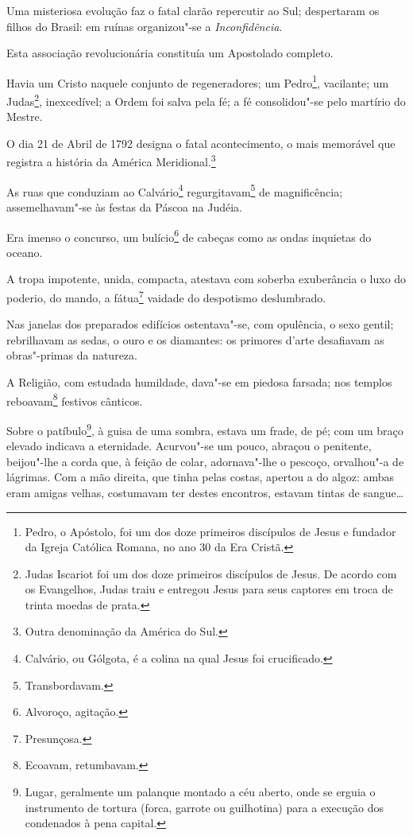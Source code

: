 Uma misteriosa evolução faz o fatal clarão repercutir ao Sul;
despertaram os filhos do Brasil: em ruínas organizou"-se a
\emph{Inconfidência}.

Esta associação revolucionária constituía um Apostolado completo.

Havia um Cristo naquele conjunto de regeneradores; um Pedro\footnote{
  Pedro, o Apóstolo, foi um dos doze primeiros discípulos de Jesus e
  fundador da Igreja Católica Romana, no ano 30 da Era Cristã.},
vacilante; um Judas\footnote{Judas Iscariot foi um dos doze primeiros
  discípulos de Jesus. De acordo com os Evangelhos, Judas traiu e
  entregou Jesus para seus captores em troca de trinta moedas de prata.},
inexcedível; a Ordem foi salva pela fé; a fé consolidou"-se pelo martírio
do Mestre.

O dia 21 de Abril de 1792 designa o fatal acontecimento, o mais
memorável que registra a história da América Meridional.\footnote{
  Outra denominação da América do Sul.}

As ruas que conduziam ao Calvário\footnote{Calvário, ou Gólgota, é a
  colina na qual Jesus foi crucificado.} regurgitavam\footnote{
  Transbordavam.} de magnificência; assemelhavam"-se às festas da Páscoa
na Judéia.

Era imenso o concurso, um bulício\footnote{Alvoroço, agitação.} de
cabeças como as ondas inquietas do oceano.

A tropa impotente, unida, compacta, atestava com soberba exuberância o
luxo do poderio, do mando, a fátua\footnote{Presunçosa.} vaidade do
despotismo deslumbrado.

Nas janelas dos preparados edifícios ostentava"-se, com opulência, o sexo
gentil; rebrilhavam as sedas, o ouro e os diamantes: os primores d'arte
desafiavam as obras"-primas da natureza.

A Religião, com estudada humildade, dava"-se em piedosa farsada; nos
templos reboavam\footnote{Ecoavam, retumbavam.} festivos cânticos.

Sobre o patíbulo\footnote{Lugar, geralmente um palanque montado a céu
  aberto, onde se erguia o instrumento de tortura (forca, garrote ou
  guilhotina) para a execução dos condenados à pena capital.}, à guisa
de uma sombra, estava um frade, de pé; com um braço elevado indicava a
eternidade. Acurvou"-se um pouco, abraçou o penitente, beijou"-lhe a corda
que, à feição de colar, adornava"-lhe o pescoço, orvalhou"-a de lágrimas.
Com a mão direita, que tinha pelas costas, apertou a do algoz: ambas
eram amigas velhas, costumavam ter destes encontros, estavam tintas de
sangue\ldots{}

